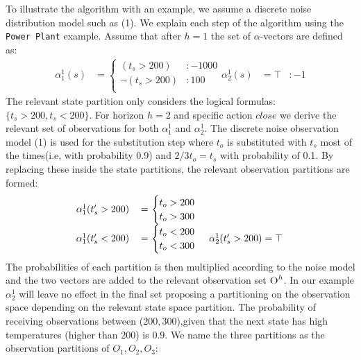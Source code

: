 \documentclass{article}
\begin{document}
To illustrate the algorithm with an example, we assume a discrete %
noise distribution model such as (1). We explain each step of the algorithm using the \texttt{Power Plant} example. Assume that after $h=1$ the set of $\alpha$-vectors are defined as:
\begin{align}
\alpha_1^1(s) &= 
\begin{cases}
 (t_s>200) &: -1000 \\
\neg(t_s>200) &: 100 \\
\end{cases}
\alpha_2^1(s) &= \top &: -1
\end{align}
The relevant state partition only considers the logical formulas: $\{t_s>200, t_s<200\}$. For horizon $h=2$ and specific action $close$ we derive the relevant set of observations for both $\alpha_1^1$ and $\alpha_2^1$. The discrete noise observation model (1) is used for the substitution step where $t_o$ is substituted with $t_s$ most of the times(i.e, with probability 0.9) and $2/3t_o=t_s$ with probability of 0.1. By replacing these inside the state partitions, the relevant observation partitions are formed: 
\begin{align*}
\begin{tabular}{r c c c l}
&
\hspace{-6mm} 
$\alpha_1^1(t_s'>200) $&= 
$\begin{cases}
  t_o>200 \\
   t_o>300  \\
 \end{cases}$
 \\
 &
\hspace{-6mm} 
$\alpha_1^1(t_s'<200) $ &= 
$\begin{cases}
 t_o<200 \\
 t_o<300 \\
\end{cases}$
&
\hspace{-4mm} 
$\alpha_2^1(t_s'>200) = \top$
\end{tabular}
\end{align*}
The probabilities of each partition is then multiplied according to the noise model and the two vectors are added to the relevant observation set $\textsc{O}^{h}$. In our example $\alpha_2^1$ will leave no effect in the final set proposing a partitioning on the observation space depending on the relevant state space partition. The probability of receiving observations between ($200,300$),given that the next state has high temperatures (higher than $200$) is $0.9$. We name the three partitions as the observation partitions of $O_1,O_2,O_3$:
\end{document}
